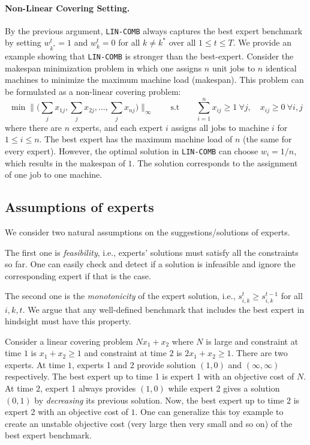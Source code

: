 \paragraph{Non-Linear Covering Setting.} By the previous argument, \texttt{LIN-COMB} always captures the best expert benchmark by setting
$w_{k^{*}}^{t} = 1$ and $w_{k}^{t} = 0$ for all $k \neq k^{*}$ over all $1 \leq t \leq T$. We provide an example showing that \texttt{LIN-COMB} is stronger than
the best-expert. Consider the makespan minimization problem in which one assigns $n$ unit jobs to $n$ identical machines to minimize the maximum machine load (makespan).
This problem can be formulated as a non-linear covering problem:
$$
\min \biggl \| \biggl( \sum_{j} x_{1j}, \sum_{j} x_{2 j}, \ldots, \sum_{j} x_{n j} \biggr) \biggr \|_{\infty}
\qquad {\text{s.t}} \qquad
\sum_{i=1}^{n} x_{ij} \geq 1 ~\forall j, \quad x_{ij} \geq 0 ~\forall i,j
$$
%
where there are $n$ experts, and each expert $i$ assigns all jobs to machine $i$ for $1 \leq i \leq n$.
%
The best expert has the maximum machine load of $n$ (the same for every expert). However, the optimal solution in \texttt{LIN-COMB} can choose $w_{i} = 1/n$, which results in the makespan of $1$. The solution corresponds to the assignment of one job to one machine.


\subsection{Assumptions of experts}		\label{sec:assumptions}
We consider two natural assumptions on the suggestions/solutions of experts.

The first one is \emph{feasibility}, i.e., experts' solutions must satisfy all the constraints so far. One can easily check and detect if a solution is infeasible and ignore the corresponding expert if that is the case.

The second one is the \emph{monotonicity} of the expert solution, i.e., $s_{i,k}^{t} \geq s_{i,k}^{t-1}$ for all $i,k,t$. We argue that any well-defined benchmark that includes the best expert in hindsight must have this property.

Consider a linear covering problem $Nx_{1} + x_{2}$ where $N$ is large and constraint at time $1$ is $x_{1} + x_{2} \geq 1$ and constraint at time $2$ is $2x_{1} + x_{2} \geq 1$.
There are two experts.
At time $1$, experts 1 and 2 provide solution $(1,0)$ and $(\infty, \infty)$ respectively.
The best expert up to time 1 is expert 1 with an objective cost of $N$.
At time $2$, expert 1 always provides $(1,0)$ while expert 2 gives a solution $(0,1)$ by \emph{decreasing} its previous solution.
Now, the best expert up to time 2 is expert 2 with an objective cost of $1$.
One can generalize this toy example to create an unstable objective cost (very large then very small and so on) of the best expert benchmark.

